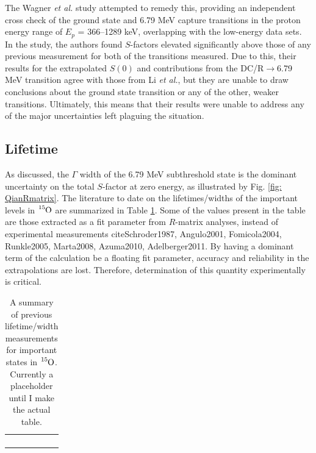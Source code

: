 The Wagner \textit{et al.} study attempted to remedy this, providing an independent cross check of the ground state and 6.79 MeV capture transitions in the proton energy range of $E_{p}$ = 366–1289 keV, overlapping with the low-energy data sets. In the study, the authors found $S$-factors elevated significantly above those of any previous measurement for both of the transitions measured. Due to this, their results for the extrapolated $S(0)$ and contributions from the DC/R$\rightarrow$6.79 MeV transition agree with those from Li \textit{et al.}, but they are unable to draw conclusions about the ground state transition or any of the other, weaker transitions. Ultimately, this means that their results were unable to address any of the major uncertainties left plaguing the situation. 



\subsection{Lifetime}


As discussed, the $\Gamma$ width of the 6.79 MeV subthreshold state is the dominant uncertainty on the total $S$-factor at zero energy, as illustrated by Fig. \ref{fig: QianRmatrix}. The literature to date on the lifetimes/widths of the important levels in $\ce{^{15}O}$ are summarized in Table \ref{table: lifetimes}. Some of the values present in the table are those extracted as a fit parameter from $R$-matrix analyses, instead of experimental measurements cite{Schroder1987, Angulo2001, Fomicola2004, Runkle2005, Marta2008, Azuma2010, Adelberger2011}. By having a dominant term of the calculation be a floating fit parameter, accuracy and reliability in the extrapolations are lost. Therefore, determination of this quantity experimentally is critical. 


 \begin{table}[]
\begin{tabular}{lllll}
 &  &  &  &  \\
 &  &  &  &  \\
 &  &  &  &  \\
 &  &  &  & 
\end{tabular}
\label{table: lifetimes}
\caption{A summary of previous lifetime/width measurements for important states in $\ce{^{15}O}$. Currently a placeholder until I make the actual table.}
\end{table}

